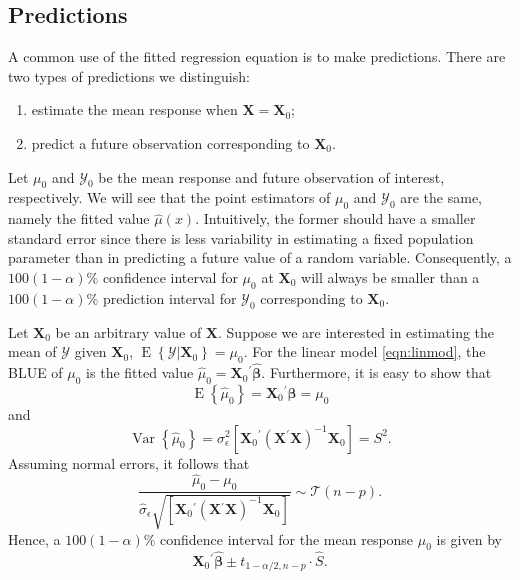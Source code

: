 \documentclass[cmfont,usenames,dvipsnames,leqno]{afit-etd}\usepackage[]{graphicx}\usepackage[]{color}
\newcommand{\trans}{\ensuremath{^\prime}}
\newcommand{\mc}[1]{\ensuremath{\mathcal{#1}}}
\newcommand{\wh}[1]{\ensuremath{\widehat{#1}}}
\newcommand{\tquant}[2]{\ensuremath{t_{#1,#2}}}
\newcommand{\E}{\operatorname{E}}
\newcommand{\var}{\operatorname{Var}}
\newcommand{\X}{\ensuremath{\bm{X}}}
\begin{document}
\subsection{Predictions}
A common use of the fitted regression equation is to make predictions. There are two types of predictions we distinguish:
\begin{enumerate}[(1)]
  \item estimate the mean response when $\X = \X_0$;
  \item predict a future observation corresponding to $\X_0$.
\end{enumerate}
Let $\mu_0$ and $\mc{Y}_0$ be the mean response and future observation of interest, respectively. We will see that the point estimators of $\mu_0$ and $\mc{Y}_0$ are the same, namely the fitted value $\wh{\mu}(x)$. Intuitively, the former should have a smaller standard error since there is less variability in estimating a fixed population parameter than in predicting a future value of a random variable. Consequently, a $100(1 - \alpha)\%$ confidence interval for $\mu_0$ at $\X_0$ will always be smaller than a $100(1 - \alpha)\%$ prediction interval for $\mc{Y}_0$ corresponding to $\X_0$.

Let $\X_0$ be an arbitrary value of $\X$. Suppose we are interested in estimating the mean of $\mc{Y}$ given $\X_0$, $\E\left\{\mc{Y} | \X_0\right\} = \mu_0$. For the linear model \eqref{eqn:linmod}, the \ac{BLUE} of $\mu_0$ is the fitted value $\wh{\mu}_0 = \X_0\trans\wh{\bm{\beta}}$. Furthermore, it is easy to show that
\begin{equation*}
  \E\left\{\wh{\mu}_0\right\} = \X_0\trans\bm{\beta} = \mu_0
\end{equation*}
and
\begin{equation*}
  \var\left\{\wh{\mu}_0\right\} = \sigma_\epsilon^2\left[\X_0\trans\left(\X\trans\X \right)^{-1}\X_0\right] = S^2.
\end{equation*}
Assuming normal errors, it follows that
\begin{equation*}
  \frac{\wh{\mu}_0 - \mu_0}{\wh{\sigma}_\epsilon\sqrt{\left[ \X_0\trans \left( \X\trans\X \right)^{-1} \X_0 \right]}} \sim \mathcal{T}\left(n-p\right).
\end{equation*}
Hence, a $100(1 - \alpha)\%$ confidence interval for the mean response $\mu_0$ is given by
\begin{equation}
\label{eqn:ci-response}
  \X_0\trans\wh{\bm{\beta}} \pm \tquant{1-\alpha/2}{n-p}  \cdot  \widehat{S}.
\end{equation}
\end{document}
